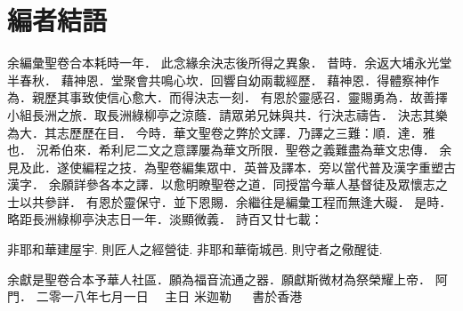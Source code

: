 \chapter*{編者結語}

余編彙聖卷合本耗時一年．
此念緣余決志後所得之異象．
\newline
\newline
昔時．余返大埔永光堂半春秋．
藉神恩．堂聚會共鳴心坎．回響自幼兩載經歷．
藉神恩．得體察神作為．親歷其事致使信心愈大．而得決志一刻．
有恩於靈感召．靈賜勇為．故善擇小組長洲之旅．取長洲綠柳亭之涼蔭．請眾弟兄妹與共．行決志禱告．
決志其樂為大．其志歷歷在目．
\newline
\newline
今時．華文聖卷之弊於文譯．乃譯之三難：順．達．雅也．
況希伯來．希利尼二文之意譯屢為華文所限．聖卷之義難盡為華文忠傳．
余見及此．遂使編程之技．為聖卷編集眾中．英普及譯本．旁以當代普及漢字重塑古漢字．
余願詳參各本之譯．以愈明瞭聖卷之道．同授當今華人基督徒及眾懷志之士以共參詳．
有恩於靈保守．並下恩賜．余繼往是編彙工程而無逢大礙．
\newline
\newline
是時．略距長洲綠柳亭決志日一年．淡顯微義．
\newline
\newline
詩百又廿七載：
\newline
\newline
\begin{center}
    非耶和華建屋宇. 則匠人之經營徒. 
\newline
    非耶和華衛城邑. 則守者之儆醒徒.
\newline
\newline
\end{center}
余獻是聖卷合本予華人社區．願為福音流通之器．願獻斯微材為祭榮耀上帝．
\newline
\newline
阿門．
\newline
\newline
二零一八年七月一日~~ 主日
\newline
\newline
米迦勒 ~~ 書於香港
